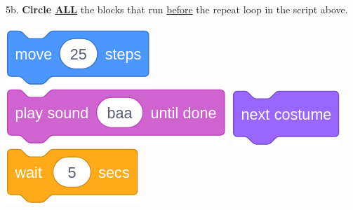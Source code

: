 \documentclass[letterpaper,12pt]{article}
\begin{document}
\noindent 5b. \textbf{Circle \underline{ALL}} the blocks that run \underline{before} the repeat loop in the script above. \\ \\
\includegraphics[scale=.3]{q5_script1.png} \hspace{1cm}
\includegraphics[scale=.3]{q5_script2.png} \hspace{1cm}
\includegraphics[scale=.3]{q5_script3.png} \hspace{1cm}
\includegraphics[scale=.3]{q5_script4.png} \hspace{1cm}\\
\end{document}
